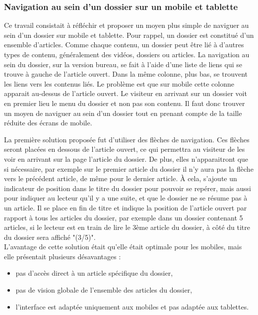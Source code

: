 \documentclass[12pt,a4paper]{article}
\begin{document}
\subsubsection{Navigation au sein d'un dossier sur un mobile et tablette}
Ce travail consistait à réfléchir et proposer un moyen plus simple de naviguer au sein d'un dossier sur mobile et tablette. Pour rappel, un dossier est constitué d'un ensemble d'articles. Comme chaque contenu, un dossier peut être lié à d'autres types de contenu, généralement des vidéos, dossiers ou articles. La navigation au sein du dossier, sur la version bureau, se fait à l'aide d'une liste de liens qui se trouve à gauche de l'article ouvert. Dans la même colonne, plus bas, se trouvent les liens vers les contenus liés. Le problème est que sur mobile cette colonne apparait au-dessus de l'article ouvert. Le visiteur en arrivant sur un dossier voit en premier lieu le menu du dossier et non pas son contenu. Il faut donc trouver un moyen de naviguer au sein d'un dossier tout en prenant compte de la taille réduite des écrans de mobile.\par
La première solution proposée fut d'utiliser des flèches de navigation. Ces flèches seront placées en dessous de l'article ouvert, ce qui permettra au visiteur de les voir en arrivant sur la page l'article du dossier. De plus, elles n'apparaitront que si nécessaire, par exemple sur le premier article du dossier il n'y aura pas la flèche vers le précédent article, de même pour le dernier article. À cela, s'ajoute un indicateur de position dans le titre du dossier pour pouvoir se repérer, mais aussi pour indiquer au lecteur qu'il y a une suite, et que le dossier ne se résume pas à un article. Il se place en fin de titre et indique la position de l'article ouvert par rapport à tous les articles du dossier, par exemple dans un dossier contenant 5 articles, si le lecteur est en train de lire le 3ème article du dossier, à côté du titre du dossier sera affiché "(3/5)".\\
L'avantage de cette solution était qu'elle était optimale pour les mobiles, mais elle présentait plusieurs désavantages :
\begin{itemize}
\item pas d'accès direct à un article spécifique du dossier,
\item pas de vision globale de l'ensemble des articles du dossier,
\item l'interface est adaptée uniquement aux mobiles et pas adaptée aux tablettes.
\end{itemize}\par
\end{document}
